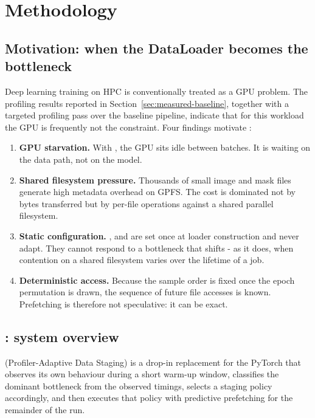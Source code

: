 \section{Methodology}
\label{ch:methodology}

\subsection{Motivation: when the DataLoader becomes the bottleneck}

Deep learning training on HPC is conventionally treated as a GPU problem.
The profiling results reported in Section~\ref{sec:measured-baseline}, together with
a targeted profiling pass over the baseline pipeline, indicate that for this
workload the GPU is frequently not the constraint.
Four findings motivate \pads{}:

\begin{enumerate}
  \item \textbf{GPU starvation.} With , the GPU sits
    idle between batches. It is waiting on the data path, not on the model.
  \item \textbf{Shared filesystem pressure.} Thousands of small image and mask files
    generate high metadata overhead on GPFS. The cost is dominated not by bytes
    transferred but by per-file operations against a shared parallel filesystem.
  \item \textbf{Static configuration.} , 
    and  are set once at loader construction and never adapt.
    They cannot respond to a bottleneck that shifts - as it does, when contention
    on a shared filesystem varies over the lifetime of a job.
  \item \textbf{Deterministic access.} Because the sample order is fixed once the
    epoch permutation is drawn, the sequence of future file accesses is known.
    Prefetching is therefore not speculative: it can be exact.
\end{enumerate}

\subsection{\pads{}: system overview}

\pads{} (Profiler-Adaptive Data Staging) is a drop-in replacement for the PyTorch
 that observes its own behaviour during a short warm-up window,
classifies the dominant bottleneck from the observed timings, selects a staging
policy accordingly, and then executes that policy with predictive prefetching for
the remainder of the run.


